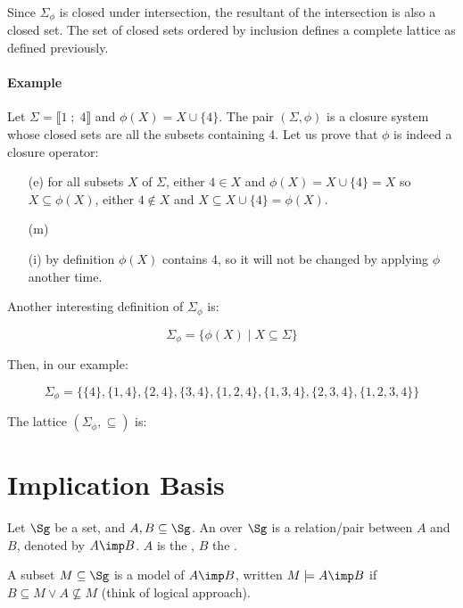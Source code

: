 \documentclass[a4paper]{report}
\begin{document}
\noindent Since $\Sigma_{\phi}$ is closed under intersection, the resultant of
the intersection is also a closed set. The set of closed sets ordered by 
inclusion defines a complete lattice as defined previously. 


\paragraph{Example} Let $\Sigma = \llbracket 1 \; ; \; 4 \rrbracket$ and 
$\phi(X) = X \cup \{4 \}$. The pair $(\Sigma, \phi)$ is a closure system whose
closed sets are all the subsets containing 4. Let us prove that $\phi$ is indeed
a closure operator:
\begin{itemize}
	\item[(e)] for all subsets $X$ of $\Sigma$, either $4 \in X$ and 
	$\phi(X) = X \cup \{4 \} = X$ so $X \subseteq \phi(X)$, either $4 \notin X$
	and $X \subseteq X \cup \{4 \} = \phi(X)$.
	\item[(m)]
	\item[(i)] by definition $\phi(X)$ contains 4, so it will not be
	changed by applying $\phi$ another time.
\end{itemize}

\noindent Another interesting definition of $\Sigma_{\phi}$ is:

	\[ \Sigma_{\phi} = \{ \phi(X) \; | \; X \subseteq \Sigma \} \]

\noindent Then, in our example:

	\[ \Sigma_{\phi} = \{ \{ 4\}, \{ 1, 4\}, \{ 2, 4\},
		\{ 3, 4\}, \{ 1, 2, 4\}, \{ 1, 3, 4\},\{ 2, 3, 4\}, 
		\{ 1, 2, 3, 4\} \}
	\]
	
\noindent The lattice $(\Sigma_{\phi}, \subseteq)$ is:



	 
\section{Implication Basis}

\begin{definition} Let $\Sg$ be a set, and $A, B 
\subseteq 
\Sg$. An  over $\Sg$ is a relation/pair between $A$ and 
$B$, denoted by $A \imp B$. $A$ is the , $B$ the 
. 	
\end{definition}

\begin{definition} A subset $M \subseteq 
\Sg$ is a model of $A \imp B$, written $M \models A 
\imp B$ if $B \subseteq M \lor A \nsubseteq M$ (think of logical 
approach).
\end{definition}
\end{document}
